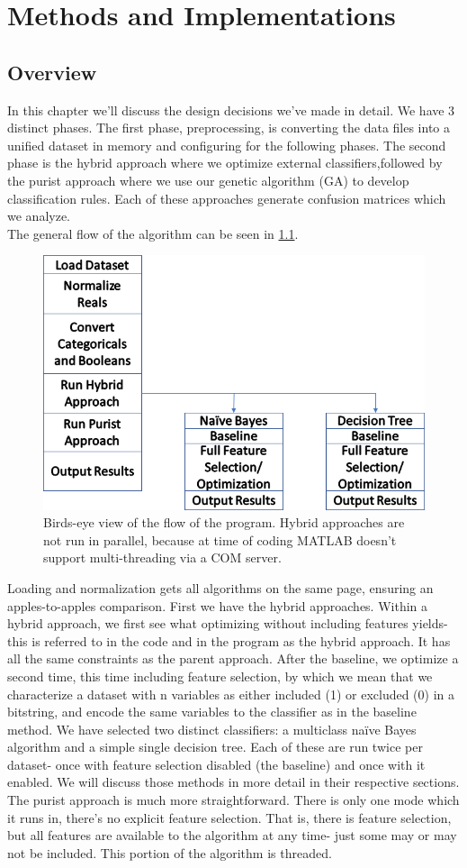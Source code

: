 \chapter{Methods and Implementations} \label{ch:Methods}
\section{Overview}
In this chapter we'll discuss the design decisions we've made in detail.  We
have 3 distinct phases.  The first phase, preprocessing, is converting the data files into a unified dataset in memory and configuring for the following phases.  The second phase is the hybrid approach where we optimize external classifiers,followed by the purist approach where we use our genetic algorithm (GA) to develop classification rules.  Each of these approaches generate confusion matrices which we analyze.\\
The general flow of the algorithm can be seen in \ref{fig:ProgramFlow}. 
\begin{figure}
	\centering
	\includegraphics[width=0.7\linewidth]{figures/png/ProgramFlow}
	\caption[Overall Program Flow]{Birds-eye view of the flow of the program.
		Hybrid approaches are not run in parallel, because at time of coding MATLAB
		doesn't support multi-threading via a COM server.}
	\label{fig:ProgramFlow}
\end{figure}
Loading and normalization gets all algorithms on the same page, ensuring an
apples-to-apples comparison.  First we have the hybrid approaches.  Within a
hybrid approach, we first see what optimizing without including features yields- this is referred to in the code and in the program as the hybrid approach.  It
has all the same constraints as the parent approach.  After the baseline, we
optimize a second time, this time including feature selection, by which we mean
that we characterize a dataset with n variables as either included (1) or
excluded (0) in a bitstring, and encode the same variables to the classifier as
in the baseline method.  We have selected two distinct classifiers: a multiclass
na\"ive Bayes algorithm and a simple single decision tree.  Each of these are
run twice per dataset- once with feature selection disabled (the baseline) and
once with it enabled.  We will discuss those methods in more detail in their
respective sections.\\The purist approach is much more straightforward.  There
is only one mode which it runs in, there's no explicit feature selection.  That
is, there is feature selection, but all features are available to the algorithm
at any time- just some may or may not be included. This portion of the algorithm
is threaded.  
